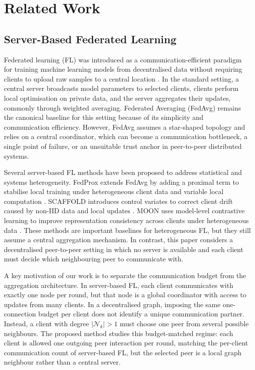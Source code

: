\documentclass[conference]{IEEEtran}
\begin{document}
\section{Related Work}
\label{sec:related-work}

\subsection{Server-Based Federated Learning}
\label{subsec:server-based-federated-learning}
Federated learning (FL) was introduced as a communication-efficient paradigm for training machine learning models from decentralised data without requiring clients to upload raw samples to a central location \cite{mcmahan2017communication}. In the standard setting, a central server broadcasts model parameters to selected clients, clients perform local optimisation on private data, and the server aggregates their updates, commonly through weighted averaging. Federated Averaging (FedAvg) remains the canonical baseline for this setting because of its simplicity and communication efficiency. However, FedAvg assumes a star-shaped topology and relies on a central coordinator, which can become a communication bottleneck, a single point of failure, or an unsuitable trust anchor in peer-to-peer distributed systems.

Several server-based FL methods have been proposed to address statistical and systems heterogeneity. FedProx extends FedAvg by adding a proximal term to stabilise local training under heterogeneous client data and variable local computation \cite{li2020fedprox}. SCAFFOLD introduces control variates to correct client drift caused by non-IID data and local updates \cite{karimireddy2020scaffold}. MOON uses model-level contrastive learning to improve representation consistency across clients under heterogeneous data \cite{li2021moon}. These methods are important baselines for heterogeneous FL, but they still assume a central aggregation mechanism. In contrast, this paper considers a decentralised peer-to-peer setting in which no server is available and each client must decide which neighbouring peer to communicate with.

A key motivation of our work is to separate the communication budget from the aggregation architecture. In server-based FL, each client communicates with exactly one node per round, but that node is a global coordinator with access to updates from many clients. In a decentralised graph, imposing the same one-connection budget per client does not identify a unique communication partner. Instead, a client with degree $|\mathcal{N}_k|>1$ must choose one peer from several possible neighbours. The proposed method studies this budget-matched regime: each client is allowed one outgoing peer interaction per round, matching the per-client communication count of server-based FL, but the selected peer is a local graph neighbour rather than a central server.
\end{document}
